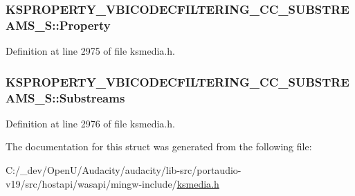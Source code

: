 \subsubsection[{\texorpdfstring{Property}{Property}}]{ K\+S\+P\+R\+O\+P\+E\+R\+T\+Y\+\_\+\+V\+B\+I\+C\+O\+D\+E\+C\+F\+I\+L\+T\+E\+R\+I\+N\+G\+\_\+\+C\+C\+\_\+\+S\+U\+B\+S\+T\+R\+E\+A\+M\+S\+\_\+\+S\+::\+Property}\hypertarget{struct_k_s_p_r_o_p_e_r_t_y___v_b_i_c_o_d_e_c_f_i_l_t_e_r_i_n_g___c_c___s_u_b_s_t_r_e_a_m_s___s_a6c74ddde960d45a80a899d7e0c9d2a93}{}\label{struct_k_s_p_r_o_p_e_r_t_y___v_b_i_c_o_d_e_c_f_i_l_t_e_r_i_n_g___c_c___s_u_b_s_t_r_e_a_m_s___s_a6c74ddde960d45a80a899d7e0c9d2a93}


Definition at line 2975 of file ksmedia.\+h.

\subsubsection[{\texorpdfstring{Substreams}{Substreams}}]{ K\+S\+P\+R\+O\+P\+E\+R\+T\+Y\+\_\+\+V\+B\+I\+C\+O\+D\+E\+C\+F\+I\+L\+T\+E\+R\+I\+N\+G\+\_\+\+C\+C\+\_\+\+S\+U\+B\+S\+T\+R\+E\+A\+M\+S\+\_\+\+S\+::\+Substreams}\hypertarget{struct_k_s_p_r_o_p_e_r_t_y___v_b_i_c_o_d_e_c_f_i_l_t_e_r_i_n_g___c_c___s_u_b_s_t_r_e_a_m_s___s_a81feb77bba17809e8ed4673ccaa0eb5e}{}\label{struct_k_s_p_r_o_p_e_r_t_y___v_b_i_c_o_d_e_c_f_i_l_t_e_r_i_n_g___c_c___s_u_b_s_t_r_e_a_m_s___s_a81feb77bba17809e8ed4673ccaa0eb5e}


Definition at line 2976 of file ksmedia.\+h.



The documentation for this struct was generated from the following file\+:\begin{DoxyCompactItemize}
\item 
C\+:/\+\_\+dev/\+Open\+U/\+Audacity/audacity/lib-\/src/portaudio-\/v19/src/hostapi/wasapi/mingw-\/include/\hyperlink{ksmedia_8h}{ksmedia.\+h}\end{DoxyCompactItemize}
